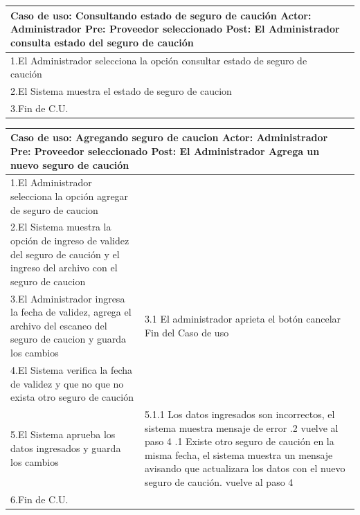 \begin{longtable}{|p{}|p{}|}
    \hline
    \multicolumn{2}{|p{16cm}|}{
        \textbf{Caso de uso:} Consultando estado de seguro de caución \newline
        \textbf{Actor:} Administrador\newline
        \textbf{Pre: }  Proveedor seleccionado \newline
        \textbf{Post:} El Administrador consulta estado del seguro de caución
    }\\
    \hline
    1.El Administrador selecciona la opción consultar estado de seguro de caución&  \\
    \hline
    2.El Sistema muestra el estado de seguro de caucion&  \\
    \hline
    3.Fin de C.U.& \\
    \hline
\end{longtable}

\begin{longtable}{|p{}|p{}|}
    \hline
    \multicolumn{2}{|p{16cm}|}{
        \textbf{Caso de uso:} Agregando seguro de caucion\newline
        \textbf{Actor:} Administrador\newline
        \textbf{Pre: }  Proveedor seleccionado\newline
        \textbf{Post:} El Administrador Agrega un nuevo seguro de caución
    }\\
    \hline
    1.El Administrador selecciona la opción agregar de seguro de caucion& \\
    \hline
    2.El Sistema muestra la opción de ingreso de validez del seguro de caución y el ingreso del archivo con el seguro de caucion&  \\
    \hline
    3.El Administrador ingresa la fecha de validez, agrega el archivo del escaneo del seguro de caucion y guarda los cambios&3.1 El administrador aprieta el botón cancelar \newline 3.2 Fin del Caso de uso \\
    \hline
    4.El Sistema verifica la fecha de validez y que no que no exista otro seguro de caución & \\
    \hline
    5.El Sistema aprueba los datos ingresados y guarda los cambios &5.1.1 Los datos ingresados son incorrectos, el sistema muestra mensaje de error \newline 5.1.2 vuelve al paso 4 \newline 5.2.1 Existe otro seguro de caución en la misma fecha, el sistema muestra un mensaje avisando que actualizara los datos con el nuevo seguro de caución. \newline 5.2 vuelve al paso 4\\
    \hline
    6.Fin de C.U.& \\
    \hline
\end{longtable}

